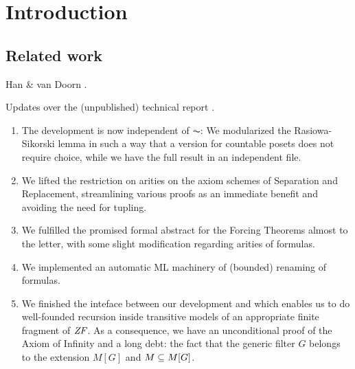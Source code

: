\section{Introduction}
\label{sec:introduction}

\subsection{Related work}

Han \& van Doorn \cite{han_et_al:LIPIcs:2019:11074}.

Updates over the (unpublished) technical report \cite{2019arXiv190103313G}.

\begin{enumerate}
\item The development is now independent of $\AC$: We modularized the
  Rasiowa-Sikorski lemma in such a way that a version for countable
  posets does not require choice, while we have the full result in an
  independent file.
\item We lifted the restriction on arities on the axiom schemes of
  Separation and Replacement, streamlining various proofs as an
  immediate benefit and avoiding the need for tupling. 
\item We fulfilled the promised formal abstract for the Forcing
  Theorems almost to the letter, with some slight modification
  regarding arities of formulas.
\item We implemented an automatic ML machinery of (bounded) renaming
  of formulas.
\item We finished the inteface between our development and
   which enables us to do well-founded
  recursion inside transitive models of an appropriate finite fragment
  of $\mathit{ZF}$. As a consequence, we have an unconditional proof of
  the Axiom of Infinity and a long debt: the fact that the generic
  filter $G$ belongs to the extension $M[G]$ and $M\subseteq M[G]$.
\end{enumerate}

